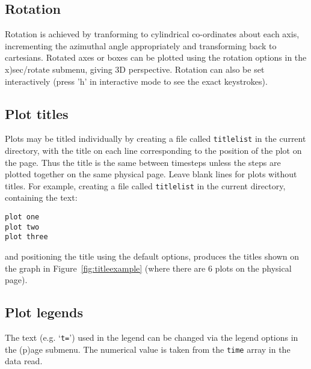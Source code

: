 \documentclass[a4paper,11pt]{article}
\begin{document}
\subsection{Rotation}
 Rotation is achieved by tranforming to cylindrical co-ordinates about each axis, incrementing the
azimuthal angle appropriately and transforming back to cartesians. Rotated axes or boxes can be
plotted using the rotation options in the x)sec/rotate submenu, giving 3D perspective. Rotation can also be set
interactively (press 'h' in interactive mode to see the exact keystrokes). 

\subsection{Plot titles}
\label{sec:title}
 Plots may be titled individually by creating a file called \verb+titlelist+ in
the current directory, with the title on each line corresponding to the position
of the plot on the page. Thus the title is the same between timesteps unless the
steps are plotted together on the same physical page. Leave blank lines for
plots without titles. For example, creating a file called \verb+titlelist+ in
the current directory, containing the text:
\begin{verbatim}
plot one
plot two
plot three
\end{verbatim}
and positioning the title using the default options, produces the titles shown
on the graph in Figure~\ref{fig:titleexample} (where there are 6 plots on the physical page).

%

\subsection{Plot legends}
\label{sec:legend}
 The text (e.g. `\verb+t=+') used in the legend can be changed via
the legend options in the (p)age submenu. The numerical value is taken from the \verb+time+ array
in the data read.
\end{document}
